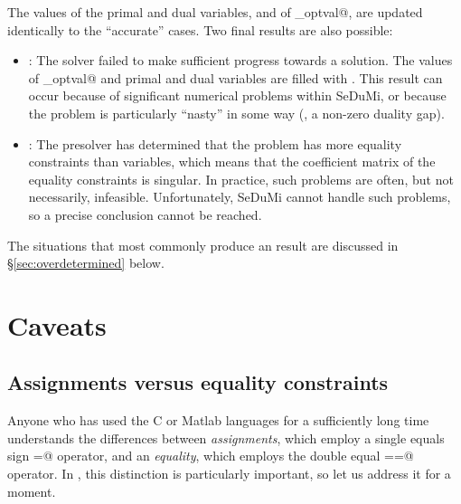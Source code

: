\documentclass[12pt]{article}
\begin{document}
The values of the primal and dual variables, and of \verb@cvx_optval@, are updated
identically to the ``accurate'' cases. Two final results are also possible:
\begin{itemize}
	\item \verb@Failed@: The solver failed to make sufficient progress towards
	      a solution. The values of \verb@cvx_optval@ and primal and dual
	      variables are filled with \verb@NaN@s. This result can occur because
	      of significant numerical problems within SeDuMi, or because the problem
	      is particularly ``nasty'' in some way (\eg, a non-zero duality gap).
	\item \verb@Overdetermined@: The presolver has determined that the problem
	      has more equality constraints than variables, which means that the coefficient
	      matrix of the equality constraints is singular. In practice, such problems are
	      often, but not necessarily, infeasible. Unfortunately, SeDuMi 
	      cannot handle such problems, so a precise conclusion
	      cannot be reached.
\end{itemize}
The situations that most commonly produce an \verb@Overdetermined@ result are discussed
in \S\ref{sec:overdetermined} below.

\section{Caveats}

\subsection{Assignments versus equality constraints}
\label{sec:eqass}

Anyone who has used the C or Matlab languages for a sufficiently long time
understands the differences between \emph{assignments}, which employ a single
equals sign \verb@=@ operator, and an \emph{equality}, which employs the
double equal \verb@==@ operator. In \cvx, this distinction is particularly
important, so let us address it for a moment.
\end{document}
